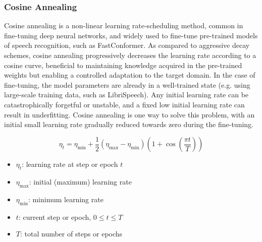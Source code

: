\subsubsection{Cosine Annealing}
Cosine annealing is a non-linear learning rate-scheduling method, common in fine-tuning deep neural networks, and widely used to fine-tune pre-trained models of speech recognition, such as FastConformer. As compared to aggressive decay schemes, cosine annealing progressively decreases the learning rate according to a cosine curve, beneficial to maintaining knowledge acquired in the pre-trained weights but enabling a controlled adaptation to the target domain.
In the case of fine-tuning, the model parameters are already in a well-trained state (e.g. using large-scale training data, such as LibriSpeech). Any initial learning rate can be catastrophically forgetful or unstable, and a fixed low initial learning rate can result in underfitting. Cosine annealing is one way to solve this problem, with an initial small learning rate gradually reduced towards zero during the fine-tuning.

\begin{equation}
\eta_t
=
\eta_{\min}
+
\frac{1}{2}
\left(\eta_{\max} - \eta_{\min}\right)
\left(
1 + \cos\left(\frac{\pi t}{T}\right)
\right)
\end{equation}

\begin{itemize}
  \item $\eta_t$: learning rate at step or epoch $t$
  \item $\eta_{\max}$: initial (maximum) learning rate
  \item $\eta_{\min}$: minimum learning rate
  \item $t$: current step or epoch, $0 \leq t \leq T$
  \item $T$: total number of steps or epochs
\end{itemize}

